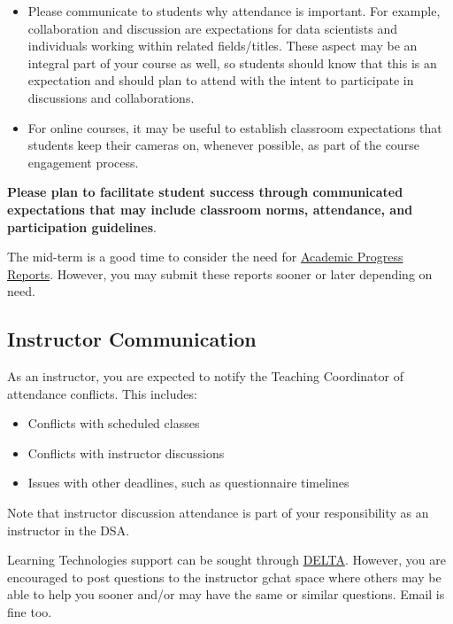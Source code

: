 \documentclass[
]{book}
\providecommand{\tightlist}{%
  \setlength{\itemsep}{0pt}\setlength{\parskip}{0pt}}
\begin{document}
\begin{itemize}
\item
  Please communicate to students why attendance is important. For example, collaboration and discussion are expectations for data scientists and individuals working within related fields/titles. These aspect may be an integral part of your course as well, so students should know that this is an expectation and should plan to attend with the intent to participate in discussions and collaborations.
\item
  For online courses, it may be useful to establish classroom expectations that students keep their cameras on, whenever possible, as part of the course engagement process.
\end{itemize}

{ \textbf{Please plan to facilitate student success through communicated expectations that may include classroom norms, attendance, and participation guidelines}. }

The mid-term is a good time to consider the need for \href{https://dasa.ncsu.edu/faculty-resources/academic-progress-reporting/}{Academic Progress Reports}. However, you may submit these reports sooner or later depending on need.

\hypertarget{instructor-communication}{%
\subsection{Instructor Communication}\label{instructor-communication}}

As an instructor, you are expected to notify the Teaching Coordinator of attendance conflicts. This includes:

\begin{itemize}
\tightlist
\item
  Conflicts with scheduled classes
\item
  Conflicts with instructor discussions
\item
  Issues with other deadlines, such as questionnaire timelines
\end{itemize}

Note that instructor discussion attendance is part of your responsibility as an instructor in the DSA.

Learning Technologies support can be sought through \href{https://delta.ncsu.edu/learntech-request/}{DELTA}. However, you are encouraged to post questions to the instructor gchat space where others may be able to help you sooner and/or may have the same or similar questions. Email is fine too.
\end{document}
